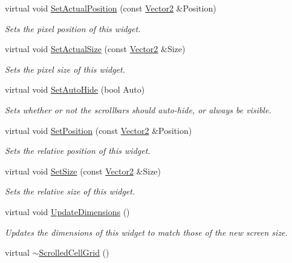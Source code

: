 \begin{DoxyCompactItemize}
virtual void \hyperlink{classMezzanine_1_1UI_1_1ScrolledCellGrid_a0daef581b08b9c5ca547bfc3db23a384}{SetActualPosition} (const \hyperlink{classMezzanine_1_1Vector2}{Vector2} \&Position)
\begin{DoxyCompactList}\small\item\em Sets the pixel position of this widget. \item\end{DoxyCompactList}\item 
virtual void \hyperlink{classMezzanine_1_1UI_1_1ScrolledCellGrid_ae55c3df53dd4e40e51df62a08a2a2f69}{SetActualSize} (const \hyperlink{classMezzanine_1_1Vector2}{Vector2} \&Size)
\begin{DoxyCompactList}\small\item\em Sets the pixel size of this widget. \item\end{DoxyCompactList}\item 
virtual void \hyperlink{classMezzanine_1_1UI_1_1ScrolledCellGrid_a1b14bd16257f2cee916b49fc79a92b0f}{SetAutoHide} (bool Auto)
\begin{DoxyCompactList}\small\item\em Sets whether or not the scrollbars should auto-\/hide, or always be visible. \item\end{DoxyCompactList}\item 
virtual void \hyperlink{classMezzanine_1_1UI_1_1ScrolledCellGrid_ab4e8250c846990325c3a6ccfbf5b322a}{SetPosition} (const \hyperlink{classMezzanine_1_1Vector2}{Vector2} \&Position)
\begin{DoxyCompactList}\small\item\em Sets the relative position of this widget. \item\end{DoxyCompactList}\item 
virtual void \hyperlink{classMezzanine_1_1UI_1_1ScrolledCellGrid_ac924cf5c94e3eb52bffc7d984683f1e6}{SetSize} (const \hyperlink{classMezzanine_1_1Vector2}{Vector2} \&Size)
\begin{DoxyCompactList}\small\item\em Sets the relative size of this widget. \item\end{DoxyCompactList}\item 
virtual void \hyperlink{classMezzanine_1_1UI_1_1ScrolledCellGrid_abb580fbe187054004c6f3f0eadec8b7e}{UpdateDimensions} ()
\begin{DoxyCompactList}\small\item\em Updates the dimensions of this widget to match those of the new screen size. \item\end{DoxyCompactList}\item 
\hypertarget{classMezzanine_1_1UI_1_1ScrolledCellGrid_a9c082813befaac18d17480a7fe6efe69}{
virtual \hyperlink{classMezzanine_1_1UI_1_1ScrolledCellGrid_a9c082813befaac18d17480a7fe6efe69}{$\sim$ScrolledCellGrid} ()}
\label{classMezzanine_1_1UI_1_1ScrolledCellGrid_a9c082813befaac18d17480a7fe6efe69}


\end{DoxyCompactItemize}
